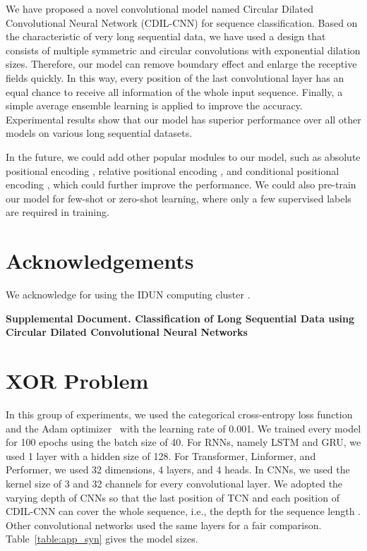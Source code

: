 \documentclass{article}
\begin{document}
We have proposed a novel convolutional model named Circular Dilated Convolutional Neural Network (CDIL-CNN) for sequence classification. Based on the characteristic of very long sequential data, we have used a design that consists of multiple symmetric and circular convolutions with exponential dilation sizes. Therefore, our model can remove boundary effect and enlarge the receptive fields quickly. In this way, every position of the last convolutional layer has an equal chance to receive all information of the whole input sequence. Finally, a simple average ensemble learning is applied to improve the accuracy. Experimental results show that our model has superior performance over all other models on various long sequential datasets.

In the future, we could add other popular modules to our model, such as absolute positional encoding \cite{vaswani2017attention}, relative positional encoding \cite{shaw2018self}, and conditional positional encoding \cite{chu2021conditional}, which could further improve the performance. We could also pre-train our model for few-shot or zero-shot learning, where only a few supervised labels are required in training.

\section{Acknowledgements}
We acknowledge for using the IDUN computing cluster \cite{idun}.

  
  


\clearpage
\begin{center}
\textbf{\large Supplemental Document. Classification of Long Sequential Data using Circular Dilated Convolutional Neural Networks}
\end{center}

\setcounter{equation}{0}
\setcounter{figure}{0}
\setcounter{table}{0}
\setcounter{page}{1}
\setcounter{section}{0}
\section{XOR Problem}
In this group of experiments, we used the categorical cross-entropy loss function and the Adam optimizer~\cite{kingma2014adam} with the learning rate of 0.001. We trained every model for 100 epochs using the batch size of 40. For RNNs, namely LSTM and GRU, we used 1 layer with a hidden size of 128. For Transformer, Linformer, and Performer, we used 32 dimensions, 4 layers, and 4 heads. In CNNs, we used the kernel size of 3 and 32 channels for every convolutional layer. We adopted the varying depth of CNNs so that the last position of TCN and each position of CDIL-CNN can cover the whole sequence, i.e., the depth  for the sequence length . Other convolutional networks used the same layers for a fair comparison. Table~\ref{table:app_syn} gives the model sizes.
\end{document}
